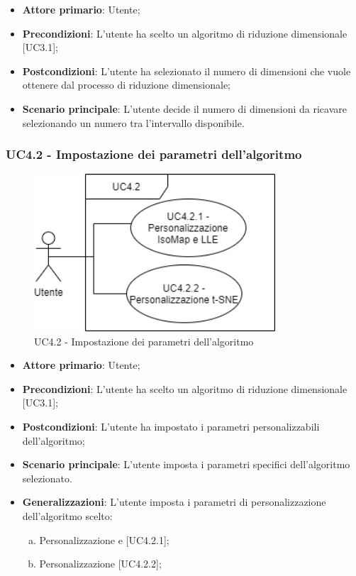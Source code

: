 \begin{itemize}
	\item \textbf{Attore primario}: Utente;
	
	\item \textbf{Precondizioni}: L'utente ha scelto un algoritmo di riduzione dimensionale [UC3.1];
	
	\item \textbf{Postcondizioni}: L'utente ha selezionato il numero di dimensioni che vuole ottenere dal processo di riduzione dimensionale;
	
	\item \textbf{Scenario principale}: L'utente decide il numero di dimensioni da ricavare selezionando un numero tra l'intervallo disponibile.
\end{itemize}	
	
\newpage	
	
\subsubsection{UC4.2 - Impostazione dei parametri dell'algoritmo}
\begin{figure}[h]
\includegraphics[width=9cm]{Section/Images/UC4.2.png}
\centering
\caption{UC4.2 - Impostazione dei parametri dell'algoritmo}
\end{figure}
\begin{itemize}
	\item \textbf{Attore primario}: Utente;
	
	\item \textbf{Precondizioni}: L'utente ha scelto un algoritmo di riduzione dimensionale [UC3.1];
	
	\item \textbf{Postcondizioni}: L'utente ha impostato i parametri personalizzabili dell'algoritmo;
	
	\item \textbf{Scenario principale}: L'utente imposta i parametri specifici dell'algoritmo selezionato.
	
		\item \textbf{Generalizzazioni}: L'utente imposta i parametri di personalizzazione dell'algoritmo scelto:
	\begin{enumerate}[(a)]
		\item Personalizzazione  e  [UC4.2.1];
		\item Personalizzazione  [UC4.2.2];
	\end{enumerate}
\end{itemize}		
		

